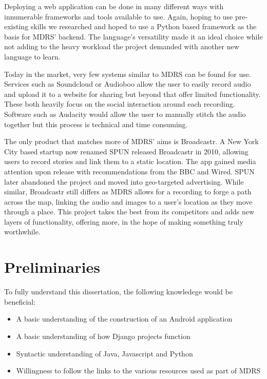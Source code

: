 \documentclass{l3proj}
\begin{document}
Deploying a web application can be done in many different ways with innumerable frameworks and tools available to use. Again, hoping to use pre-existing skills we researched and hoped to use a \gls{Python} based framework as the basis for MDRS’ backend.  The language's versatility made it an ideal choice while not adding to the heavy workload the project demanded with another new language to learn.

Today in the market, very few systems similar to MDRS can be found for use. Services such as Soundcloud or Audioboo allow the user to easily record audio and upload it to a website for sharing but beyond that offer limited functionality. These both heavily focus on the social interaction around each recording. Software such as Audacity would allow the user to manually stitch the audio together but this process is technical and time consuming.

The only product that matches more of MDRS’ aims is Broadcastr. A New York City based startup now renamed SPUN released Broadcastr in 2010, allowing users to record stories and link them to a static location. The app gained media attention upon release with recommendations from the BBC and Wired. SPUN later abandoned the project and moved into geo-targeted advertising. While similar, Broadcastr still differs as MDRS allows for a recording to forge a path across the map, linking the audio and images to a user’s location as they move through a place. This project takes the best from its competitors and adds new layers of functionality, offering more, in the hope of making something truly worthwhile.

\section{Preliminaries}
To fully understand this dissertation, the following knowledege would be beneficial:
\begin{itemize}
\item A basic understanding of the construction of an Android application
\item A basic understanding of how \gls{Django} projects function
\item Syntactic understanding of Java, Javascript and Python
\item Willingness to follow the links to the various resources used as part of MDRS
\end{itemize}

\end{document}
